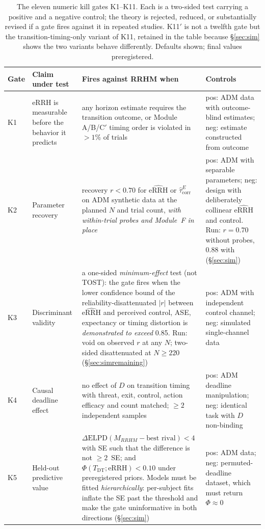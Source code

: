 \documentclass[9pt,twocolumn]{article}
\newcommand{\eRRH}{\mathrm{eRRH}}
\newcommand{\eRRHhat}{\widehat{\mathrm{eRRH}}}
\newcommand{\Tdt}{T_{\mathrm{DT}}}
\newcommand{\tcorr}{\widehat{\tau}^{E}_{\mathrm{corr}}}
\begin{document}
\begin{table}[!t]
\centering
\caption{The eleven numeric kill gates K1--K11. Each is a two-sided test carrying a positive and a negative control; the theory is rejected, reduced, or substantially revised if a gate fires against it in repeated studies. K11$'$ is not a twelfth gate but the transition-timing-only variant of K11, retained in the table because \S\ref{sec:sim} shows the two variants behave differently. Defaults shown; final values preregistered.}
\label{tab:gates}
\small
\begin{tabularx}{\textwidth}{p{}p{}X p{}}
\toprule
\textbf{Gate} & \textbf{Claim under test} & \textbf{Fires against RRHM when} & \textbf{Controls} \\
\midrule
K1 & eRRH is measurable before the behavior it predicts & any horizon estimate requires the transition outcome, or Module A/B/C$'$ timing order is violated in $>1\%$ of trials & pos: ADM data with outcome-blind estimates; neg: estimate constructed from outcome \\
K2 & Parameter recovery & recovery $r<0.70$ for $\eRRHhat$ or $\tcorr$ on ADM synthetic data at the planned $N$ and trial count, \emph{with within-trial probes and Module~F in place} & pos: ADM with separable parameters; neg: design with deliberately collinear $\eRRHhat$ and control. Run: $r=0.70$ without probes, $0.88$ with (\S\ref{sec:sim}) \\
K3 & Discriminant validity & a one-sided \emph{minimum-effect} test (not TOST): the gate fires when the lower confidence bound of the reliability-disattenuated $|r|$ between $\eRRHhat$ and perceived control, ASE, expectancy or timing distortion is \emph{demonstrated to exceed} 0.85. Run: void on observed $r$ at any $N$; two-sided disattenuated at $N\ge220$ (\S\ref{sec:simremaining}) & pos: ADM with independent control channel; neg: simulated single-channel data \\
K4 & Causal deadline effect & no effect of $D$ on transition timing with threat, exit, control, action efficacy and count matched; $\ge2$ independent samples & pos: ADM deadline manipulation; neg: identical task with $D$ non-binding \\
K5 & Held-out predictive value & $\Delta\mathrm{ELPD}(M_{RRHM}-\text{best rival})<4$ with SE such that the difference is not $\ge2$~SE; and $\Phi(\Tdt;\eRRH)<0.10$ under preregistered priors. Models must be fitted \emph{hierarchically}: per-subject fits inflate the SE past the threshold and make the gate uninformative in both directions (\S\ref{sec:sim}) & pos: ADM data; neg: permuted-deadline dataset, which must return $\Phi\approx0$ \\

\end{tabularx}
\end{table}
\end{document}
